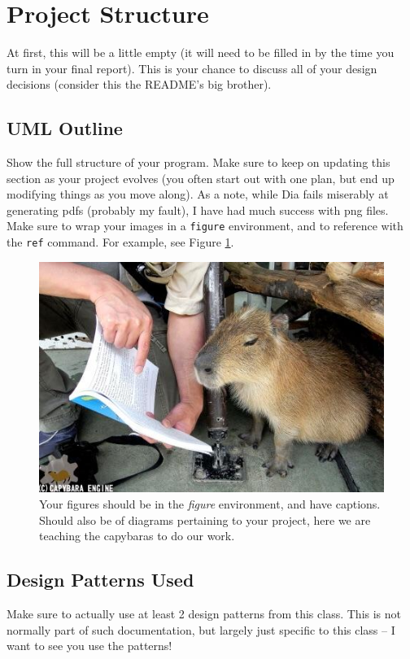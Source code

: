 \documentclass[10pt,conference,onecolumn,compsoc]{IEEEtran}
\begin{document}
\section{Project Structure}
At first, this will be a little empty (it will need to be filled in by the time you turn in your final report).  This is your chance to discuss all of your design decisions (consider this the README's big brother).

\subsection{UML Outline}
Show the full structure of your program.  Make sure to keep on updating this section as your project evolves (you often start out with one plan, but end up modifying things as you move along).  As a note, while Dia fails miserably at generating pdfs (probably my fault), I have had much success with png files.  Make sure to wrap your images in a \texttt{figure} environment, and to reference with the \texttt{ref} command.  For example, see Figure \ref{capybara2}.

\begin{figure}[ht!]
\includegraphics[scale=1]{capybara2.jpg}
\caption{Your figures should be in the \emph{figure} environment, and have captions.  Should also be of diagrams pertaining to your project, here we are teaching the capybaras to do our work.}
\label{capybara2}
\end{figure}


\subsection{Design Patterns Used}
Make sure to actually use at least 2 design patterns from this class.  This is not normally part of such documentation, but largely just specific to this class -- I want to see you use the patterns!
\end{document}
